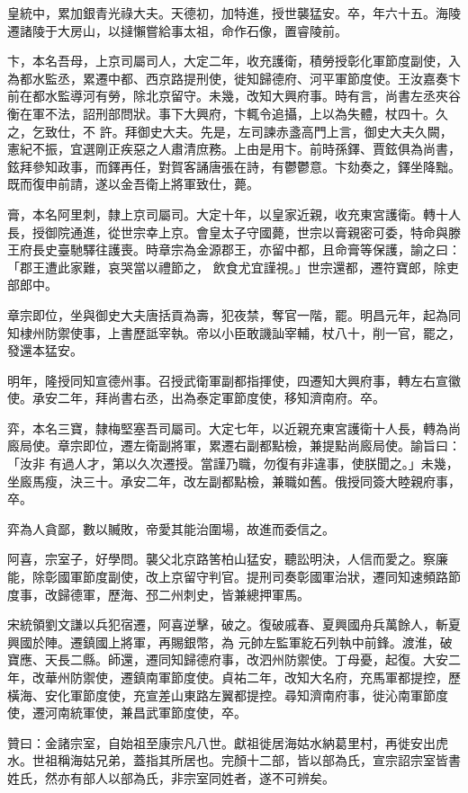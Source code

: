 \begin{pinyinscope}
 皇統中，累加銀青光祿大夫。天德初，加特進，授世襲猛安。卒，年六十五。海陵遷諸陵于大房山，以撻懶嘗給事太祖，命作石像，置睿陵前。



 卞，本名吾母，上京司屬司人，大定二年，收充護衛，積勞授彰化軍節度副使，入為都水監丞，累遷中都、西京路提刑使，徙知歸德府、河平軍節度使。王汝嘉奏卞前在都水監導河有勞，除北京留守。未幾，改知大興府事。時有言，尚書左丞夾谷衡在軍不法，詔刑部問狀。事下大興府，卞輒令追攝，上以為失體，杖四十。久之，乞致仕，不
 許。拜御史大夫。先是，左司諫赤盞高門上言，御史大夫久闕，憲紀不振，宜選剛正疾惡之人肅清庶務。上由是用卞。前時孫鐸、賈鉉俱為尚書，鉉拜參知政事，而鐸再任，對賀客誦唐張在詩，有鬱鬱意。卞劾奏之，鐸坐降黜。既而復申前請，遂以金吾衛上將軍致仕，薨。



 膏，本名阿里刺，隸上京司屬司。大定十年，以皇家近親，收充東宮護衛。轉十人長，授御院通進，從世宗幸上京。會皇太子守國薨，世宗以膏親密可委，特命與滕王府長史臺馳驛往護喪。時章宗為金源郡王，亦留中都，且命膏等保護，諭之曰：「郡王遭此家難，哀哭當以禮節之，
 飲食尤宜謹視。」世宗還都，遷符寶郎，除吏部郎中。



 章宗即位，坐與御史大夫唐括貢為壽，犯夜禁，奪官一階，罷。明昌元年，起為同知棣州防禦使事，上書歷詆宰執。帝以小臣敢譏訕宰輔，杖八十，削一官，罷之，發還本猛安。



 明年，隆授同知宣德州事。召授武衛軍副都指揮使，四遷知大興府事，轉左右宣徽使。承安二年，拜尚書右丞，出為泰定軍節度使，移知濟南府。卒。



 弈，本名三寶，隸梅堅塞吾司屬司。大定七年，以近親充東宮護衛十人長，轉為尚廄局使。章宗即位，遷左衛副將軍，累遷右副都點檢，兼提點尚廄局使。諭旨曰：「汝非
 有過人才，第以久次遷授。當謹乃職，勿復有非違事，使朕聞之。」未幾，坐廄馬瘦，決三十。承安二年，改左副都點檢，兼職如舊。俄授同簽大睦親府事，卒。



 弈為人貪鄙，數以贓敗，帝愛其能治圍場，故進而委信之。



 阿喜，宗室子，好學問。襲父北京路筈柏山猛安，聽訟明決，人信而愛之。察廉能，除彰國軍節度副使，改上京留守判官。提刑司奏彰國軍治狀，遷同知速頻路節度事，改歸德軍，歷海、邳二州刺史，皆兼總押軍馬。



 宋統領劉文謙以兵犯宿遷，阿喜逆擊，破之。復破戚春、夏興國舟兵萬餘人，斬夏興國於陣。遷鎮國上將軍，再賜銀幣，為
 元帥左監軍紇石列執中前鋒。渡淮，破寶應、天長二縣。師還，遷同知歸德府事，改泗州防禦使。丁母憂，起復。大安二年，改華州防禦使，遷鎮南軍節度使。貞祐二年，改知大名府，充馬軍都提控，歷橫海、安化軍節度使，充宣差山東路左翼都提控。尋知濟南府事，徙沁南軍節度使，遷河南統軍使，兼昌武軍節度使，卒。



 贊曰：金諸宗室，自始祖至康宗凡八世。獻祖徙居海姑水納葛里村，再徙安出虎水。世祖稱海姑兄弟，蓋指其所居也。完顏十二部，皆以部為氏，宣宗詔宗室皆書姓氏，然亦有部人以部為氏，非宗室同姓者，遂不可辨矣。



\end{pinyinscope}